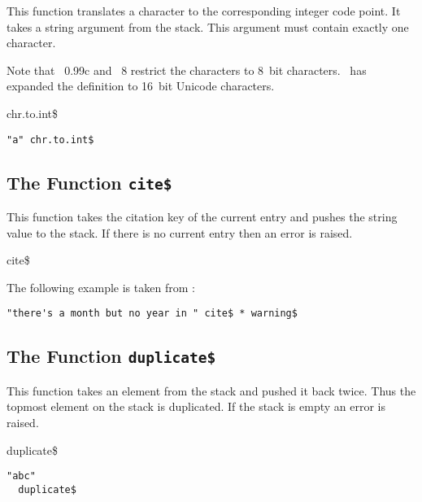 This function translates a character to the corresponding integer code
point. It takes a string argument from the stack. This argument must
contain exactly one character.

Note that \BibTeX~0.99c and
\BibTeX~8 restrict the characters to 8~bit
characters. \ExBib\ has expanded the definition to 16~bit
Unicode characters.

\begin{BstFunction}{chr.to.int\$}
\end{BstFunction}

\begin{lstlisting}[language=bst]
  "a" chr.to.int$
\end{lstlisting}%


\subsection{The Function \texttt{cite\$}}%

This function takes the citation key of the current entry and pushes
the string value to the stack. If there is no current entry then an
error is raised.

\begin{BstFunction}{cite\$}
\end{BstFunction}

The following example is taken from :

\begin{lstlisting}[language=bst]
  "there's a month but no year in " cite$ * warning$
\end{lstlisting}


\subsection{The Function \texttt{duplicate\$}}%

This function takes an element from the stack and pushed it back
twice. Thus the topmost element on the stack is duplicated. If the
stack is empty an error is raised.

\begin{BstFunction}{duplicate\$}
\end{BstFunction}

\begin{lstlisting}[language=bst]
  "abc"
  duplicate$
\end{lstlisting}%

